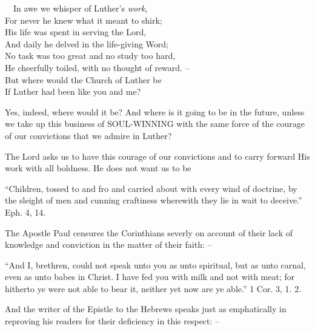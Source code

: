 \documentclass[
]{book}
\begin{document}
~~In awe we whisper of Luther's \emph{work},\\
\hspace*{0.333em}\hspace*{0.333em}For never he knew what it meant to shirk;\\
\hspace*{0.333em}\hspace*{0.333em}His life was spent in serving the Lord,\\
\hspace*{0.333em}\hspace*{0.333em}And daily he delved in the life-giving Word;\\
\hspace*{0.333em}\hspace*{0.333em}No task was too great and no study too hard,\\
\hspace*{0.333em}\hspace*{0.333em}He cheerfully toiled, with no thought of reward. --\\
\hspace*{0.333em}\hspace*{0.333em}But where would the Church of Luther be\\
\hspace*{0.333em}\hspace*{0.333em}If Luther had been like you and me?

Yes, indeed, where would it be? And where is it going to be in the future, unless we take up this business of SOUL-WINNING with the same force of the courage of our convictions that we admire in Luther?

The Lord asks us to have this courage of our convictions and to carry forward His work with all boldness. He does not want us to be

``Children, tossed to and fro and carried about with every wind of doctrine, by the sleight of men and cunning craftiness wherewith they lie in wait to deceive.'' Eph. 4, 14.

The Apostle Paul censures the Corinthians severly on account of their lack of knowledge and conviction in the matter of their faith: --

``And I, brethren, could not speak unto you as unto spiritual, but as unto carnal, even as unto babes in Christ. I have fed you with milk and not with meat; for hitherto ye were not able to bear it, neither yet now are ye able.'' 1 Cor. 3, 1. 2.

And the writer of the Epistle to the Hebrews speaks just as emphatically in reproving his readers for their deficiency in this respect: --
\end{document}
